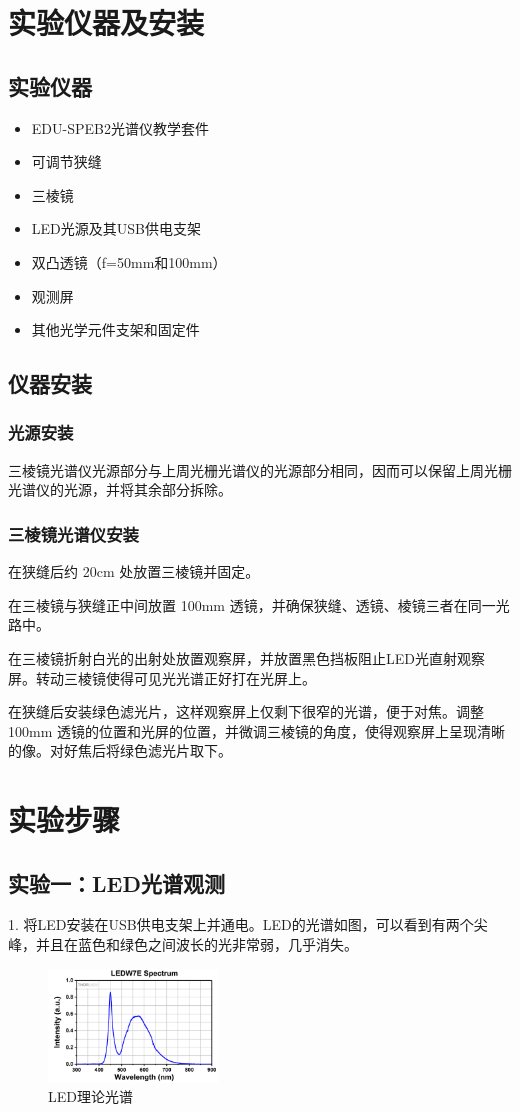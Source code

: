 \documentclass{ctexart}
\begin{document}
\section{实验仪器及安装}
\subsection{实验仪器}
\begin{itemize}
    \item EDU-SPEB2光谱仪教学套件
    \item 可调节狭缝
    \item 三棱镜
    \item LED光源及其USB供电支架
    \item 双凸透镜（f=50mm和100mm）
    \item 观测屏
    \item 其他光学元件支架和固定件
\end{itemize}
\subsection{仪器安装}
\subsubsection{光源安装}
三棱镜光谱仪光源部分与上周光栅光谱仪的光源部分相同，因而可以保留上周光栅光谱仪的光源，并将其余部分拆除。

\subsubsection{三棱镜光谱仪安装}
在狭缝后约 20cm 处放置三棱镜并固定。

在三棱镜与狭缝正中间放置 100mm 透镜，并确保狭缝、透镜、棱镜三者在同一光路中。

在三棱镜折射白光的出射处放置观察屏，并放置黑色挡板阻止LED光直射观察屏。转动三棱镜使得可见光光谱正好打在光屏上。

在狭缝后安装绿色滤光片，这样观察屏上仅剩下很窄的光谱，便于对焦。调整 100mm 透镜的位置和光屏的位置，并微调三棱镜的角度，使得观察屏上呈现清晰的像。对好焦后将绿色滤光片取下。
\section{实验步骤}

\subsection{实验一：LED光谱观测}
1. 将LED安装在USB供电支架上并通电。LED的光谱如图，可以看到有两个尖峰，并且在蓝色和绿色之间波长的光非常弱，几乎消失。
\begin{figure}[H]
    \centering
    \includegraphics[width=0.4\textwidth,height=0.2\textwidth]{pictures/光谱图.png}
    \caption{LED理论光谱}
\end{figure}
\end{document}
